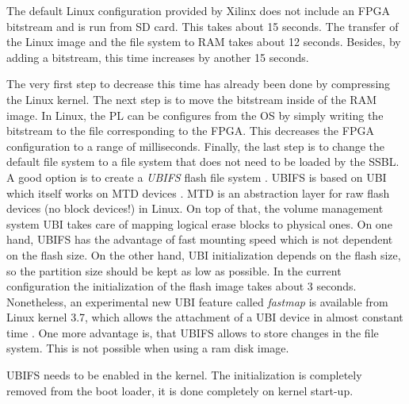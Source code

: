 The default Linux configuration provided by Xilinx does not include an \ac{FPGA} bitstream and is run from \ac{SD} card.
This takes about 15 seconds.
The transfer of the Linux image and the file system to \ac{RAM} takes about 12 seconds. 
Besides, by adding a bitstream, this time increases by another 15 seconds.   
\par
The very first step to decrease this time has already been done by compressing the Linux kernel.
The next step is to move the bitstream inside of the RAM image. 
In Linux, the \ac{PL} can be configures from the \ac{OS} by simply writing the bitstream to the file corresponding to the \ac{FPGA}. 
This decreases the \ac{FPGA} configuration to a range of milliseconds. 
Finally, the last step is to change the default file system to a file system that does not need to be loaded by the \ac{SSBL}.
A good option is to create a \textit{\ac{UBIFS}} flash file system \cite{ubifs}.
\ac{UBIFS} is based on \ac{UBI} which itself works on \ac{MTD} devices \cite{mtd}.
\ac{MTD} is an abstraction layer for raw flash devices (no block devices!) in Linux.
On top of that, the volume management system \ac{UBI} takes care of mapping logical erase blocks to physical ones.  
On one hand, \ac{UBIFS} has the advantage of fast mounting speed which is not dependent on the flash size.
On the other hand, \ac{UBI} initialization depends on the flash size, so the partition size should be kept as low as possible.
In the current configuration the initialization of the flash image takes about 3 seconds.
Nonetheless, an experimental new \ac{UBI} feature called \textit{fastmap} is available from Linux kernel 3.7, which allows the attachment of a \ac{UBI} device in almost constant time \cite{ubi}.
One more advantage is, that \ac{UBIFS} allows to store changes in the file system.
This is not possible when using a ram disk image.
\par
\ac{UBIFS} needs to be enabled in the kernel. 
The initialization is completely removed from the boot loader, it is done completely on kernel start-up.

